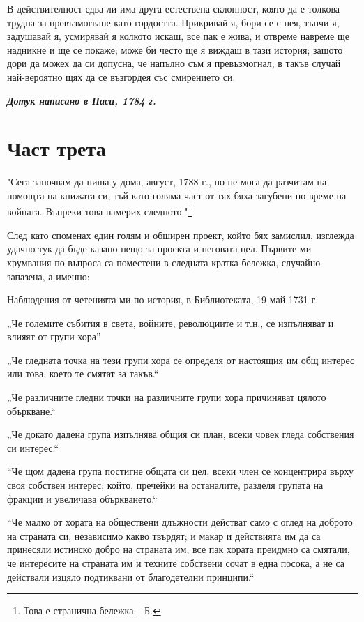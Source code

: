 \documentclass[12pt]{book}
\begin{document}
В действителност едва ли има друга естествена склонност, която да е толкова трудна за превъзмогване като гордостта. Прикривай я, бори се с нея, тъпчи я, задушавай я, усмирявай я колкото искаш, все пак е жива, и отвреме навреме ще надникне и ще се покаже; може би често ще я виждаш в тази история; защото дори да можех да си допусна, че напълно съм я превъзмогнал, в такъв случай най-вероятно щях да се възгордея със смирението си.

\textit{\textbf{Дотук написано в Паси, 1784 г.}}

\chapter{Част трета}

"Сега започвам да пиша у дома, август, 1788 г., но не мога да разчитам на помощта на книжата си, тъй като голяма част от тях бяха загубени по време на войната. Въпреки това намерих следното."\footnote{Това е странична бележка. --Б.}

След като споменах един голям и обширен проект, който бях замислил, изглежда удачно тук да бъде казано нещо за проекта и неговата цел. Първите ми хрумвания по въпроса са поместени в следната кратка бележка, случайно запазена, а именно:

Наблюдения от четенията ми по история, в Библиотеката, 19 май 1731 г.

„Че големите събития в света, войните, революциите и т.н., се изпълняват и влияят от групи хора”

„Че гледната точка на тези групи хора се определя от настоящия им общ интерес или това, което те смятат за такъв.“

„Че различните гледни точки на различните групи хора причиняват цялото объркване.“

„Че докато дадена група изпълнява общия си план, всеки човек гледа собствения си интерес.“

“Че щом дадена група постигне общата си цел, всеки член се концентрира върху своя собствен интерес; който, пречейки на останалите, разделя групата на фракции и увеличава объркването.“

“Че малко от хората на обществени длъжности действат само с оглед на доброто на страната си, независимо какво твърдят; и макар и действията им да са принесяли истинско добро на страната им, все пак хората преидмно са смятали, че интересите на страната им и техните собствени сочат в една посока, а не са действали изцяло подтиквани от благодетелни принципи.“
\end{document}
